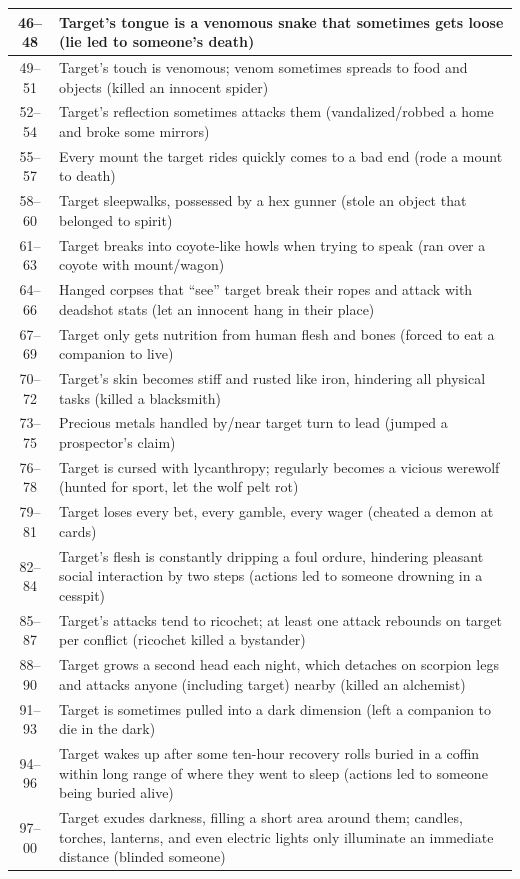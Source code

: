 \begin{longtable}{| c | p{15cm} |}
46–48  & Target’s tongue is a venomous snake that sometimes gets loose (lie led to someone’s death)  \\ \hline
49–51  & Target’s touch is venomous; venom sometimes spreads to food and objects (killed an innocent spider)  \\ \hline
52–54  & Target’s reflection sometimes attacks them (vandalized/robbed a home and broke some mirrors)  \\ \hline
55–57  & Every mount the target rides quickly comes to a bad end (rode a mount to death)  \\ \hline
58–60  & Target sleepwalks, possessed by a hex gunner (stole an object that belonged to spirit)  \\ \hline
61–63  & Target breaks into coyote‑like howls when trying to speak (ran over a coyote with mount/wagon)  \\ \hline
64–66  & Hanged corpses that “see” target break their ropes and attack with deadshot stats (let an innocent hang in their place)  \\ \hline
67–69  & Target only gets nutrition from human flesh and bones (forced to eat a companion to live)  \\ \hline
70–72  & Target’s skin becomes stiff and rusted like iron, hindering all physical tasks (killed a blacksmith)  \\ \hline
73–75  & Precious metals handled by/near target turn to lead (jumped a prospector’s claim)  \\ \hline
76–78  & Target is cursed with lycanthropy; regularly becomes a vicious werewolf (hunted for sport, let the wolf pelt rot)  \\ \hline
79–81  & Target loses every bet, every gamble, every wager (cheated a demon at cards)  \\ \hline
82–84  & Target’s flesh is constantly dripping a foul ordure, hindering pleasant social interaction by two steps (actions led to someone drowning in a cesspit) \\ \hline 
85–87  & Target’s attacks tend to ricochet; at least one attack rebounds on target per conflict (ricochet killed a bystander)  \\ \hline
88–90  & Target grows a second head each night, which detaches on scorpion legs and attacks anyone (including target) nearby (killed an alchemist)  \\ \hline
91–93  & Target is sometimes pulled into a dark dimension (left a companion to die in the dark)  \\ \hline
94–96  & Target wakes up after some ten-hour recovery rolls buried in a coffin within long range of where they went to sleep (actions led to someone being buried alive)  \\ \hline
97–00  & Target exudes darkness, filling a short area around them; candles, torches, lanterns, and even electric lights only illuminate an immediate distance (blinded someone) \\ \hline 

\end{longtable}


